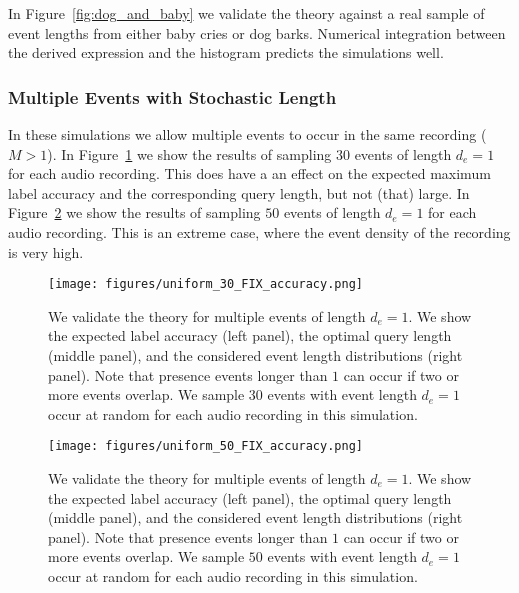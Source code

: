 In Figure~\ref{fig:dog_and_baby} we validate the theory against a real sample of event lengths from either baby cries or dog barks. Numerical integration between the derived expression and the histogram predicts the simulations well.

\subsubsection{Multiple Events with Stochastic Length}
\label{sec:multi_events}

In these simulations we allow multiple events to occur in the same recording ($M>1$). In Figure~\ref{fig:uniform_30} we show the results of sampling $30$ events of length $d_e=1$ for each audio recording. This does have a an effect on the expected maximum label accuracy and the corresponding query length, but not (that) large. In Figure~\ref{fig:uniform_50} we show the results of sampling $50$ events of length $d_e=1$ for each audio recording. This is an extreme case, where the event density of the recording is very high. %

\begin{figure}
    \centering
    \texttt{[image: figures/uniform\_30\_FIX\_accuracy.png]}
    \caption{We validate the theory for multiple events of length $d_e=1$. We show the expected label accuracy (left panel), the optimal query length (middle panel), and the considered event length distributions (right panel). Note that presence events longer than $1$ can occur if two or more events overlap. We sample $30$ events with event length $d_e=1$ occur at random for each audio recording in this simulation.}
    \label{fig:uniform_30}
\end{figure}


\begin{figure}
    \centering
    \texttt{[image: figures/uniform\_50\_FIX\_accuracy.png]}
    \caption{We validate the theory for multiple events of length $d_e=1$. We show the expected label accuracy (left panel), the optimal query length (middle panel), and the considered event length distributions (right panel). Note that presence events longer than $1$ can occur if two or more events overlap. We sample $50$ events with event length $d_e=1$ occur at random for each audio recording in this simulation.}
    \label{fig:uniform_50}
\end{figure}

